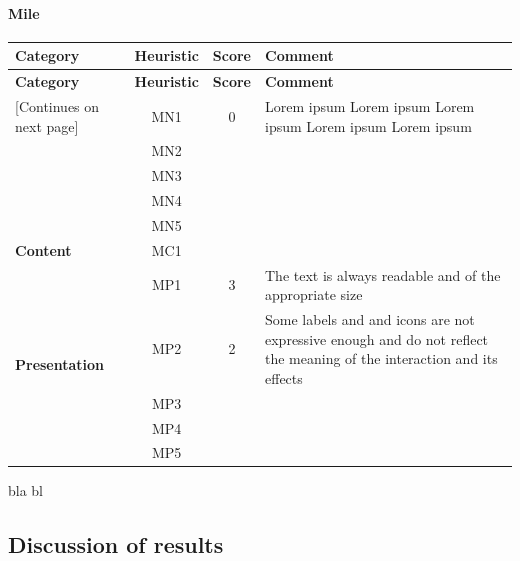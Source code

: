 \paragraph{Mile}


\begin{tabularx}{\linewidth}{l c c X}
\toprule
\textbf{Category} & \textbf{Heuristic} & \textbf{Score} & \textbf{Comment} \\
\midrule
\endfirsthead
\toprule
\textbf{Category} & \textbf{Heuristic} & \textbf{Score} & \textbf{Comment} \\
\midrule
\endhead
\midrule
\footnotesize [Continues on next page]
\endfoot
\bottomrule
\endlastfoot

\multirow{5}{*}{\textbf{Navigation}}   & MN1 & 0 & Lorem ipsum Lorem ipsum Lorem ipsum Lorem ipsum Lorem ipsum \\ \cmidrule{2-4} 
                                        & MN2 &  &  \\ \cmidrule{2-4} 
                                        & MN3 &  &  \\ \cmidrule{2-4} 
                                        & MN4 &  &  \\ \cmidrule{2-4} 
                                        & MN5 &  &  \\ \midrule
\textbf{Content}                       & MC1 &  &  \\ \midrule
\multirow{5}{*}{\textbf{Presentation}} & MP1 & 3 & The text is always readable and of the appropriate size \\ \cmidrule{2-4} 
                                        & MP2 & 2 & Some labels and and icons are not expressive enough and do not reflect the meaning of the interaction and its effects\\ \cmidrule{2-4} 
                                        & MP3 & & \\ \cmidrule{2-4} 
                                        & MP4 &  &  \\ \cmidrule{2-4} 
                                        & MP5 &  &
\end{tabularx}

bla bl
\subsection{Discussion of results}
